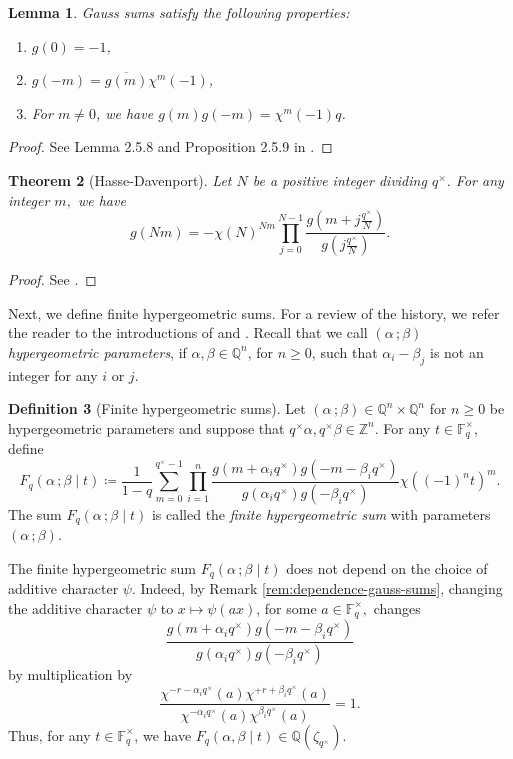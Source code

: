 \documentclass[11pt, reqno]{amsart}
\theoremstyle{plain}
\newtheorem{theo}{Theorem}[section]
\newtheorem{lem}[theo]{Lemma}
\theoremstyle{definition}
\newtheorem{defi}[theo]{Definition}
\newcommand{\Z}{\mathbb{Z}}
\newcommand{\Q}{\mathbb{Q}}
\newcommand{\F}{\mathbb{F}}
\newcommand{\be}{\beta}
\newcommand{\al}{\alpha}
\begin{document}
\begin{lem}\label{lem:gauss-sums-properties} Gauss sums satisfy the following properties:
    \begin{enumerate}
        \item $g(0)= -1$,
        \item $g(-m)= \overline{g(m)} \chi^{m}(-1)$,
        \item For $m \neq 0$, we have $g(m)g(-m) = \chi^m(-1) q$. 
    \end{enumerate}
\end{lem}
\begin{proof}
    See Lemma 2.5.8 and Proposition 2.5.9 in \cite{Cohen-book}.
\end{proof}
\begin{theo}[Hasse-Davenport]\label{Hasse-Davenport}
    Let $N$ be a positive integer dividing $q^\times$. For any integer $m,$ we have
    \[
    g(Nm) = - \chi(N)^{Nm} \prod_{j=0}^{N-1} \frac{g\left(m+j \frac{q^{\times}}{N}\right)}{g\left(j \frac{q^{\times}}{N}\right)} .
    \]
\end{theo}
\begin{proof}
  See \cite[Theorem 3.7.3]{Cohen-book}.
\end{proof}
Next, we define finite hypergeometric sums. For a review of the history, we refer the reader to the introductions of \cite{BCM} and \cite{voight-kelly}. Recall that we call $(\al \, ; \be)$ \emph{hypergeometric parameters}, if  $\al, \be \in \Q^{n}$, for $n \ge 0$, such that $\al_i-\be_j$ is not an integer for any $i$ or $j$.

\begin{defi}[Finite hypergeometric sums]\label{defi:finite-hg-function}
Let $(\alpha \, ; \beta) \in \Q^n \times \Q^n$ for $n \ge 0$ be hypergeometric parameters and suppose that $q^\times \alpha, q^\times \beta \in \Z^n$.
For any $t \in \F_q^\times$, define
\[
F_q(\al\,;\be \mid t) \coloneqq \frac{1}{1-q} \sum_{m=0}^{q^\times-1} \prod_{i=1}^n \frac{g(m+\alpha_iq^\times)g(-m-\beta_iq^\times)}{g(\alpha_iq^\times)g(-\beta_i q^\times)} \chi((-1)^nt)^m .
\]
The sum $F_q(\al\,;\be \mid t)$ is called the \emph{finite hypergeometric sum} with parameters $(\al \, ;\beta)$.
\end{defi}
The finite hypergeometric sum $F_q(\al \, ; \be \mid t)$ does not depend on the choice of additive character $\psi$. Indeed, by Remark \ref{rem:dependence-gauss-sums}, changing the additive character $\psi$ to $x \mapsto \psi(ax)$, for some $a \in \F_q^\times,$ changes
\[
\frac{g(m+\alpha_iq^\times)g(-m-\beta_iq^\times)}{g(\alpha_iq^\times)g(-\beta_i q^\times)}
\]
by multiplication by
\[
\frac{\chi^{-r-\alpha_iq^\times}(a)\chi^{+r+\beta_iq^\times}(a)}{\chi^{-\alpha_iq^\times}(a)\chi^{\beta_i q^\times}(a)} =1.\]
Thus, for any $t \in \F_q^\times$, we have $F_q(\al,\be \mid t) \in \mathbb{Q}(\zeta_{q^\times}\!)$.
\end{document}
